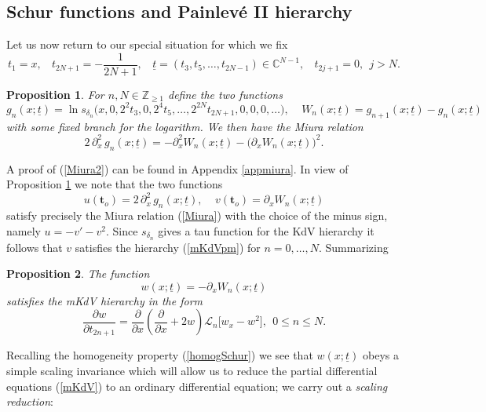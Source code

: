 \documentclass[10pt,reqno,oneside]{amsart}
\numberwithin{equation}{section}
\newtheorem{theo}{Theorem}[section]
\newtheorem{proposition}[theo]{Proposition}
\def\un{\underline}
\def\bt{\begin{theo}}
\def\bp{\begin{proposition}}
\def\ep{\end{proposition}}
\def\eqref#1{(\ref{#1})}
\def\bt{{\mathbf t}}
\begin{document}
\subsection{Schur functions and Painlev\'e II hierarchy} Let us now return to our special situation for which we fix
\begin{equation*}
	 t_1=x,\ \ \ \ t_{2N+1}=-\frac{1}{2N+1},\ \ \ \ \un t=(t_3,t_5,\ldots,t_{2N-1})\in\mathbb{C}^{N-1},\ \ \ \ t_{2j+1}=0,\ \ j>N.
\end{equation*}	
\bp\label{propMiura} For $n,N\in\mathbb{Z}_{\geq 1}$ define the two functions
\begin{equation}\label{gW}
	g_n(x;\un t)=\ln s_{\delta_n}\big(x,0,2^2t_3,0,2^4t_5,\ldots,2^{2N}t_{2N+1},0,0,0,\ldots),\ \ \ \ \ W_n(x;\un t)=g_{n+1}(x;\un t)-g_n(x;\un t)
\end{equation}
with some fixed branch for the logarithm. We then have the Miura relation
\begin{equation}\label{Miura2}
	2\,\partial_x^2\,g_n(x;\un t)=-\partial_x^2 W_n(x;\un t)-\big(\partial_x W_n(x;\un t)\big)^2.
\end{equation}
\ep
A proof of \eqref{Miura2} can be found in Appendix \ref{appmiura}. In view of Proposition \ref{propMiura} we note that the two functions 
\begin{equation}\label{uvdef}
	u(\bt_o)=2\,\partial_x^2\,g_n(x;\un t),\ \ \ \ \ v(\bt_o)=\partial_xW_n(x;\un t)
\end{equation}
satisfy precisely 
the Miura relation \eqref{Miura} with the choice of the minus sign, namely $u  = - v '- v^2$. Since $s_{\delta_n}$ gives a tau function for the KdV hierarchy it follows that $v$ satisfies the hierarchy \eqref{mKdVpm} for $n=0,\ldots,N$. Summarizing
\bp The function
\begin{equation*}
	w(x;\un t)=-\partial_xW_n(x;\un t)
\end{equation*}
satisfies the mKdV hierarchy in the form
\begin{equation}\label{mKdV}
	\frac{\partial w}{\partial t_{2n+1}}=\frac{\partial}{\partial x}\left(\frac{\partial}{\partial x}+2w\right)\mathcal{L}_n\big[w_x-w^2\big],\ \ 0\leq n\leq N.
\end{equation}
\ep
Recalling the homogeneity property \eqref{homogSchur} we see that $w(x;\un t)$ obeys a simple scaling invariance which will allow us to reduce the partial differential equations \eqref{mKdV} to an ordinary differential equation; we carry out a {\it scaling reduction}: 
\end{document}
